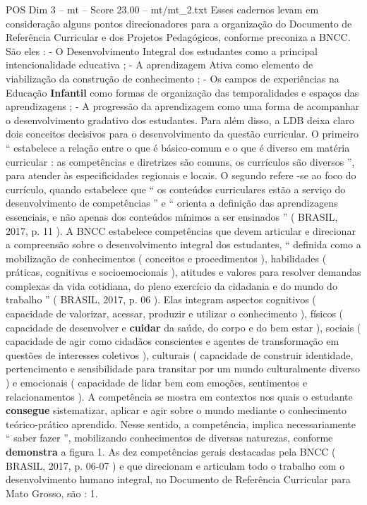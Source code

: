 \begin{textsample}{POS Dim 3 – mt – Score 23.00 – mt/mt\_2.txt}
Esses cadernos levam em consideração alguns pontos direcionadores para a organização do Documento de Referência Curricular e dos Projetos Pedagógicos, conforme preconiza a BNCC.
São eles : - O Desenvolvimento Integral dos estudantes como a principal intencionalidade educativa ; - A aprendizagem Ativa como elemento de viabilização da construção de conhecimento ; - Os campos de experiências na Educação \textbf{Infantil} como formas de organização das temporalidades e espaços das aprendizagens ; - A progressão da aprendizagem como uma forma de acompanhar o desenvolvimento gradativo dos estudantes.
Para além disso, a LDB deixa claro dois conceitos decisivos para o desenvolvimento da questão curricular.
O primeiro “ estabelece a relação entre o que é básico-comum e o que é diverso em matéria curricular : as competências e diretrizes são comuns, os currículos são diversos ”, para atender às especificidades regionais e locais.
O segundo refere -se ao foco do currículo, quando estabelece que “ os conteúdos curriculares estão a serviço do desenvolvimento de competências ” e “ orienta a definição das aprendizagens essenciais, e não apenas dos conteúdos mínimos a ser ensinados ” ( BRASIL, 2017, p. 11 ).
A BNCC estabelece competências que devem articular e direcionar a compreensão sobre o desenvolvimento integral dos estudantes, “ definida como a mobilização de conhecimentos ( conceitos e procedimentos ), habilidades ( práticas, cognitivas e socioemocionais ), atitudes e valores para resolver demandas complexas da vida cotidiana, do pleno exercício da cidadania e do mundo do trabalho ” ( BRASIL, 2017, p. 06 ).
Elas integram aspectos cognitivos ( capacidade de valorizar, acessar, produzir e utilizar o conhecimento ), físicos ( capacidade de desenvolver e \textbf{cuidar} da saúde, do corpo e do bem estar ), sociais ( capacidade de agir como cidadãos conscientes e agentes de transformação em questões de interesses coletivos ), culturais ( capacidade de construir identidade, pertencimento e sensibilidade para transitar por um mundo culturalmente diverso ) e emocionais ( capacidade de lidar bem com emoções, sentimentos e relacionamentos ).
A competência se mostra em contextos nos quais o estudante \textbf{consegue} sistematizar, aplicar e agir sobre o mundo mediante o conhecimento teórico-prático aprendido.
Nesse sentido, a competência, implica necessariamente “ saber fazer ”, mobilizando conhecimentos de diversas naturezas, conforme \textbf{demonstra} a figura 1.
As dez competências gerais destacadas pela BNCC ( BRASIL, 2017, p. 06-07 ) e que direcionam e articulam todo o trabalho com o desenvolvimento humano integral, no Documento de Referência Curricular para Mato Grosso, são : 1.

\end{textsample}
